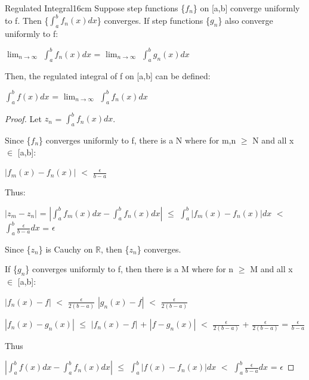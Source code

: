     \begin{wtheorem}{Regulated Integral}{16cm}
        Suppose step functions \{$f_n$\} on [a,b] converge uniformly to f.
        Then \{$\int_a^b f_n(x) dx$\} converges.
        If step functions \{$g_n$\} also converge uniformly to f:

        \hspace{0.5cm}
        $\lim_{n \rightarrow \infty}$ $\int_a^b f_n(x) dx$
        = $\lim_{n \rightarrow \infty}$ $\int_a^b g_n(x) dx$

        Then, the regulated integral of f on [a,b] can be defined:

        \hspace{0.5cm}
        $\int_a^b f(x) dx$
        = $\lim_{n \rightarrow \infty}$ $\int_a^b f_n(x) dx$
    \end{wtheorem}

    \begin{proof}
        Let $z_n$ = $\int_a^b f_n(x) dx$.
        
        Since \{$f_n$\} converges uniformly to f, there is a N where
        for m,n $\geq$ N and all x $\in$ [a,b]:

        \hspace{0.5cm}
        $|f_m(x) - f_n(x)|$ $<$ $\frac{\epsilon}{b-a}$

        Thus:

        \hspace{0.5cm}
        $|z_m - z_n|$
        = $|\int_a^b f_m(x) dx - \int_a^b f_n(x) dx|$
        $\leq$ $\int_a^b |f_m(x) - f_n(x)| dx$
        $<$ $\int_a^b \frac{\epsilon}{b-a} dx$
        = $\epsilon$

        Since \{$z_n$\} is Cauchy on $\mathbb{R}$, then 
        \{$z_n$\} converges.

        If \{$g_n$\} converges uniformly to f, then
        there is a M where for n $\geq$ M and all x $\in$ [a,b]:

        \hspace{0.5cm}
        $|f_n(x) - f|$ $<$ $\frac{\epsilon}{2(b-a)}$
        \hspace{1cm}
        $|g_n(x) - f|$ $<$ $\frac{\epsilon}{2(b-a)}$

        \hspace{0.5cm}
        $|f_n(x) - g_n(x)|$
        $\leq$ $|f_n(x) - f|$ + $|f - g_n(x)|$
        $<$ $\frac{\epsilon}{2(b-a)}$ + $\frac{\epsilon}{2(b-a)}$
        = $\frac{\epsilon}{b-a}$

        Thus
        
        \hspace{0.5cm}
        $|\int_a^b f(x) dx - \int_a^b f_n(x) dx|$
        $\leq$ $\int_a^b |f(x) - f_n(x)| dx$
        $<$ $\int_a^b \frac{\epsilon}{b-a} dx$
        = $\epsilon$
    \end{proof}

